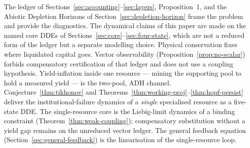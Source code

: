 \documentclass[11pt]{article}
\theoremstyle{definition}
\begin{document}
The ledger of Sections~\ref{sec:accounting}--\ref{sec:layers}, Proposition~1, and the Abiotic Depletion Horizons of Section~\ref{sec:depletion-horizon} frame the problem and provide the diagnostics. The dynamical claims of this paper are made on the named core DDEs of Sections~\ref{sec:core}--\ref{sec:four-state}, which are not a reduced form of the ledger but a separate modelling choice. Physical conservation fixes where liquidated capital goes. Vector observability (Proposition~\ref{prop:no-scalar}) forbids compensatory certification of that ledger and does not use a coupling hypothesis. Yield-inflation inside one resource --- mining the supporting pool to hold a measured yield --- is the two-pool, ADH channel. Conjecture~\ref{thm:tikhonov} and Theorems~\ref{thm:working-proj}--\ref{thm:hopf-persist} deliver the institutional-failure dynamics of a \emph{single} specialised resource as a five-state DDE. The single-resource core is the Liebig-limit dynamics of a binding constraint (Theorem~\ref{thm:weak-coupling}); compensatory substitution without a yield gap remains on the unreduced vector ledger. The general feedback equation (Section~\ref{sec:general-feedback}) is the linearisation of the single-resource loop.
\end{document}
